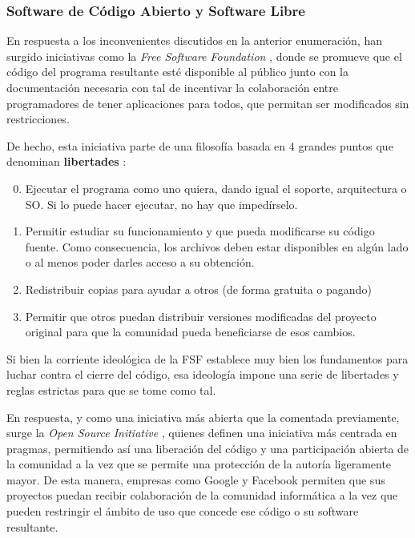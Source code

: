 \subsubsection{Software de Código Abierto y Software Libre}

En respuesta a los inconvenientes discutidos en la anterior enumeración, han surgido iniciativas como la \textit{Free Software Foundation} \cite{fsf-about}, donde se promueve que el código del programa resultante esté disponible al público junto con la documentación necesaria con tal de incentivar la colaboración entre programadores de tener aplicaciones para todos, que permitan ser modificados sin restricciones.

De hecho, esta iniciativa parte de una filosofía basada en 4 grandes puntos que denominan \textbf{libertades} \cite{fsf-philosophy}:

\begin{enumerate}
	\setcounter{enumi}{-1}
	\item Ejecutar el programa como uno quiera, dando igual el soporte, arquitectura o SO. Si lo puede hacer ejecutar, no hay que impedírselo.
	\item Permitir estudiar su funcionamiento y que pueda modificarse su código fuente. Como consecuencia, los archivos deben estar disponibles en algún lado o al menos poder darles acceso a su obtención.
	\item Redistribuir copias para ayudar a otros (de forma gratuita o pagando)
	\item Permitir que otros puedan distribuir versiones modificadas del proyecto original para que la comunidad pueda beneficiarse de esos cambios.
\end{enumerate}

Si bien la corriente ideológica de la FSF establece muy bien los fundamentos para luchar contra el cierre del código, esa ideología impone una serie de libertades y reglas estrictas para que se tome como tal. 

En respuesta, y como una iniciativa más abierta que la comentada previamente, surge la \textit{Open Source Initiative} \cite{osi-about}, quienes definen una iniciativa más centrada en pragmas, permitiendo así una liberación del código y una participación abierta de la comunidad a la vez que se permite una protección de la autoría ligeramente mayor. De esta manera, empresas como Google y Facebook permiten que sus proyectos puedan recibir colaboración de la comunidad informática a la vez que pueden restringir el ámbito de uso que concede ese código o su software resultante.

